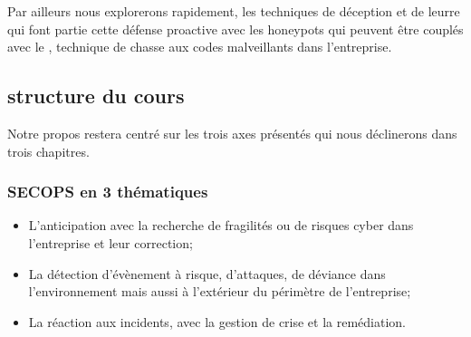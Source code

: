 Par ailleurs nous explorerons rapidement, les techniques de déception et de leurre qui font partie cette défense proactive avec les honeypots qui peuvent être couplés avec le , technique de chasse aux codes malveillants dans l'entreprise.
 
\subsection{structure du cours}

Notre propos restera centré sur les trois axes présentés qui nous déclinerons dans trois chapitres.


\begin{frame}
\frametitle<presentation>{SECOPS en 3 thématiques}
\begin{itemize}
  \item L'anticipation avec la recherche de fragilités ou de risques cyber dans l'entreprise et leur correction;
  \item La détection d'évènement à risque, d'attaques, de déviance dans l'environnement mais aussi à l'extérieur du périmètre de l'entreprise;
  \item La réaction aux incidents, avec la gestion de crise et la remédiation.
\end{itemize}
\end{frame}


